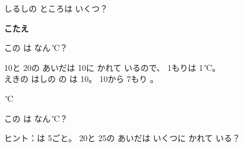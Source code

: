 \begin{jibun}
\noindent\begin{minipage}[c]{0.6\linewidth}\centering
{}
\end{minipage}\hfill
\begin{minipage}[c]{0.38\linewidth}\raggedleft
しるしの ところは いくつ？\par\vspace{2pt}
{\sffamily\bfseries\small\color{bkOrange}こたえ}\enspace\bkkakikomi[16mm]
\end{minipage}
\end{jibun}

\begin{reidai}
\noindent\begin{minipage}[c]{0.76\linewidth}
この \mbox{}は なん\,℃？

\kangaekata 10と 20の あいだは 10に かれて いるので、 \mbox{1もり}は 1\,℃。\\
えきの はしの の は 10。 10から \mbox{7もり} 。

\,℃
\end{minipage}\hfill
\begin{minipage}[c]{0.22\linewidth}\centering
{}
\end{minipage}
\end{reidai}

\begin{jibun}
\noindent\begin{minipage}[c]{0.76\linewidth}
この \mbox{}は なん\,℃？\par
{\small\color{bkOrange!58!black}ヒント：は 5ごと。 20と 25の あいだは いくつに かれて いる？}
\end{minipage}\hfill
\begin{minipage}[c]{0.22\linewidth}\centering
{}
\end{minipage}
\end{jibun}

